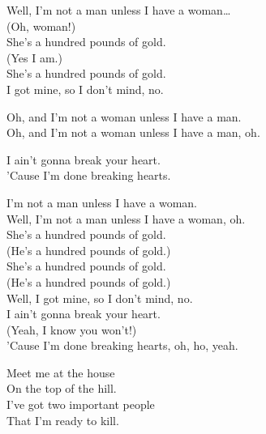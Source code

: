 
Well, I'm not a man unless I have a woman… \\
(Oh, woman!) \\

She's a hundred pounds of gold. \\
(Yes I am.) \\
She's a hundred pounds of gold. \\
I got mine, so I don't mind, no. \\


Oh, and I'm not a woman unless I have a man. \\
Oh, and I'm not a woman unless I have a man, oh. \\


I ain't gonna break your heart. \\
'Cause I'm done breaking hearts. \\


I'm not a man unless I have a woman. \\
Well, I'm not a man unless I have a woman, oh. \\

She's a hundred pounds of gold. \\
(He's a hundred pounds of gold.) \\
She's a hundred pounds of gold. \\
(He's a hundred pounds of gold.) \\
Well, I got mine, so I don't mind, no. \\

I ain't gonna break your heart. \\
(Yeah, I know you won't!) \\
'Cause I'm done breaking hearts, oh, ho, yeah. \\





Meet me at the house \\
On the top of the hill. \\
I've got two important people \\
That I'm ready to kill. \\

